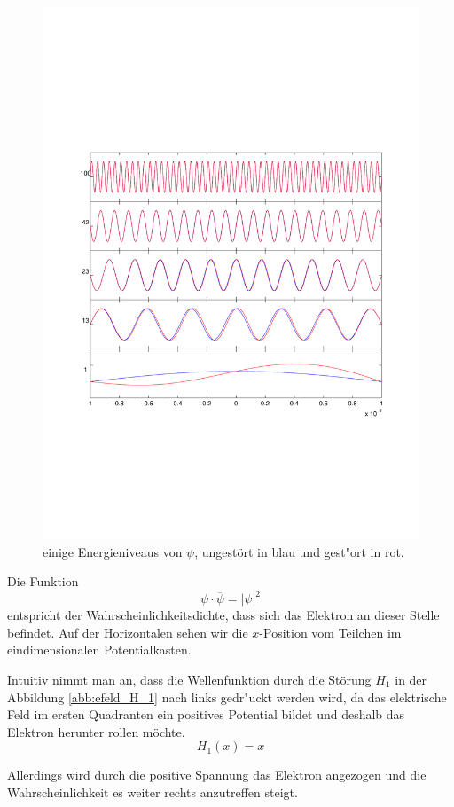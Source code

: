 \begin{refsection}
\begin{figure}
 \centering
 \includegraphics[width=12cm,clip=true,trim=2cm 6.6cm 1cm 8cm]{efeld/Psi_SubPlots_gestoert.pdf}
 \caption{einige Energieniveaus von $\psi$, ungest\"ort in blau und gest"ort in rot.}
 \label{abb:efeld_psi_gestoert}
\end{figure}

Die Funktion 
\[
  \psi \cdot \overline{\psi} = |\psi|^2
\]
entspricht der Wahrscheinlichkeitsdichte, 
dass sich das Elektron an dieser Stelle befindet.
Auf der Horizontalen sehen wir die $x$-Position vom Teilchen im eindimensionalen Potentialkasten.

Intuitiv nimmt man an, dass die Wellenfunktion durch die St\"orung $H_1$ in der Abbildung 
\ref{abb:efeld_H_1} nach links gedr"uckt werden wird, da das elektrische Feld 
im ersten Quadranten ein positives Potential bildet und deshalb das Elektron herunter rollen m\"ochte.
\[
  H_1(x) = x
\]

Allerdings wird durch die positive Spannung das Elektron angezogen und die
Wahrscheinlichkeit es weiter rechts anzutreffen steigt.


\end{refsection}
